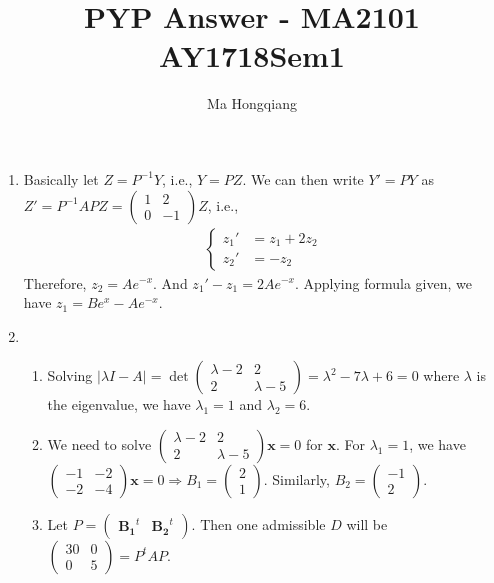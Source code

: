 \documentclass[12pt]{article}
\theoremstyle{definition}
\begin{document}
\title{PYP Answer - MA2101 AY1718Sem1}
\author{Ma Hongqiang}
\maketitle
\begin{enumerate}
  \item Basically let $Z=P^{-1}Y$, i.e., $Y=PZ$. We can then write $Y' = PY$ as $Z'=P^{-1}APZ = \begin{pmatrix}1&2\\0&-1\end{pmatrix}Z$, i.e.,
  \begin{align*}
  \begin{cases}
  z_1'&=z_1+2z_2\\
  z_2'&=-z_2
  \end{cases}
  \end{align*}
  Therefore, $z_2 = Ae^{-x}$. And $z_1'-z_1=2Ae^{-x}$. Applying formula given, we have $z_1 = Be^x-Ae^{-x}$.
  \item \begin{enumerate}
          \item Solving $|\lambda I-A|=\det\begin{pmatrix}\lambda-2&2\\2&\lambda-5\end{pmatrix} = \lambda^2-7\lambda+6=0$ where $\lambda$ is the eigenvalue, we have $\lambda_1=1$ and $\lambda_2 = 6$.
          \item We need to solve $\begin{pmatrix}\lambda-2&2\\2&\lambda-5\end{pmatrix}\mathbf{x}=0$ for $\mathbf{x}$. For $\lambda_1=1$, we have $\begin{pmatrix}-1&-2\\-2&-4\end{pmatrix}\mathbf{x}=0\Rightarrow B_1=\begin{pmatrix}2\\1\end{pmatrix}$. Similarly, $B_2=\begin{pmatrix}-1\\2\end{pmatrix}$.
          \item Let $P=\begin{pmatrix}\mathbf{B_1}^t&\mathbf{B_2}^t\end{pmatrix}$. Then one admissible $D$ will be $\begin{pmatrix}30&0\\0&5\end{pmatrix}=P^tAP$.

\end{enumerate}
\end{enumerate}
\end{document}

